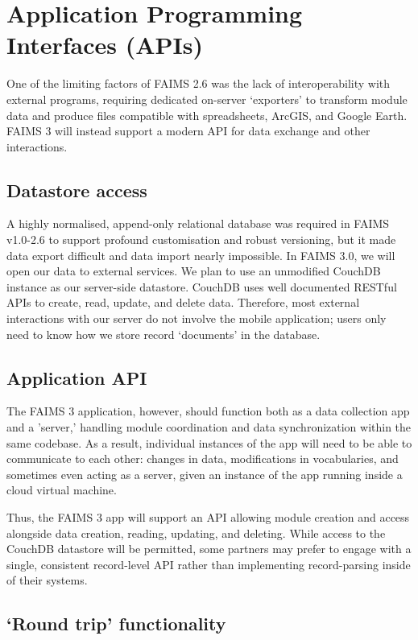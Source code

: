 \documentclass[a4paper,headings=small fontsize=10pt]{scrreprt}
\begin{document}
\section{Application Programming Interfaces
(APIs)}

One of the limiting factors of FAIMS 2.6 was the lack of
interoperability with external programs, requiring dedicated on-server
`exporters' to transform module data and produce files compatible with
spreadsheets, ArcGIS, and Google Earth. FAIMS 3 will instead support a
modern API for data exchange and other interactions.

\subsection{Datastore access}

A highly normalised, append-only relational database was required in
FAIMS v1.0-2.6 to support profound customisation and robust versioning,
but it made data export difficult and data import nearly impossible. In
FAIMS 3.0, we will open our data to external services. We plan to use an
unmodified CouchDB instance as our server-side datastore. CouchDB uses
well documented RESTful APIs to create, read, update, and delete data.
Therefore, most external interactions with our server do not involve the
mobile application; users only need to know how we store record
`documents' in the database.

\subsection{Application API}

The FAIMS 3 application, however, should function both as a data
collection app and a 'server,' handling module coordination and data
synchronization within the same codebase. As a result, individual
instances of the app will need to be able to communicate to each other:
changes in data, modifications in vocabularies, and sometimes even
acting as a server, given an instance of the app running inside a cloud
virtual machine.

Thus, the FAIMS 3 app will support an API allowing module creation and
access alongside data creation, reading, updating, and deleting. While
access to the CouchDB datastore will be permitted, some partners may
prefer to engage with a single, consistent record-level API rather than
implementing record-parsing inside of their systems.

\subsection{`Round trip' functionality
}
\end{document}
